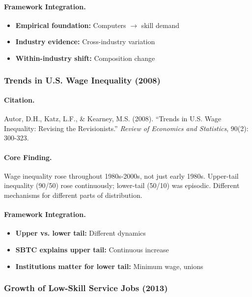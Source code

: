 \documentclass[12pt,a4paper]{article}
\begin{document}
\paragraph{Framework Integration.}
\begin{itemize}
  \item \textbf{Empirical foundation:} Computers $\to$ skill demand
  \item \textbf{Industry evidence:} Cross-industry variation
  \item \textbf{Within-industry shift:} Composition change
\end{itemize}

\subsubsection{Trends in U.S. Wage Inequality (2008)}

\paragraph{Citation.}
Autor, D.H., Katz, L.F., \& Kearney, M.S. (2008). ``Trends in U.S.
Wage Inequality: Revising the Revisionists.''
\emph{Review of Economics and Statistics}, 90(2): 300-323.

\paragraph{Core Finding.}
Wage inequality rose throughout 1980s-2000s, not just early 1980s.
Upper-tail inequality (90/50) rose continuously; lower-tail (50/10)
was episodic. Different mechanisms for different parts of distribution.

\paragraph{Framework Integration.}
\begin{itemize}
  \item \textbf{Upper vs. lower tail:} Different dynamics
  \item \textbf{SBTC explains upper tail:} Continuous increase
  \item \textbf{Institutions matter for lower tail:} Minimum wage, unions
\end{itemize}

\subsubsection{Growth of Low-Skill Service Jobs (2013)}
\end{document}
